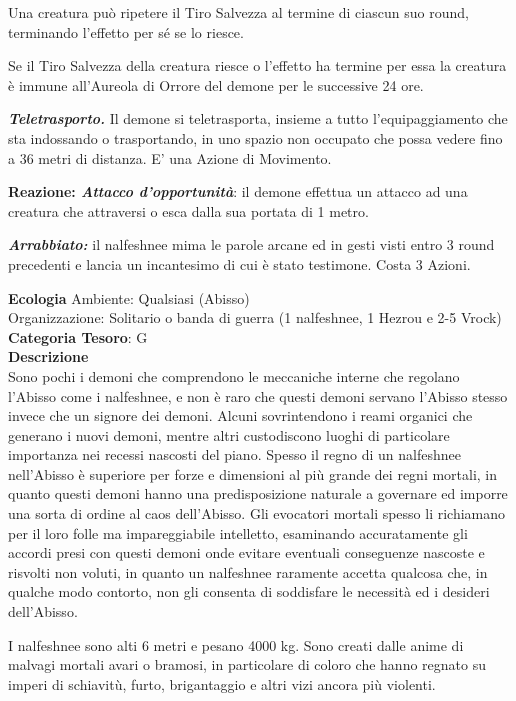 \begin{multicols}{2}
{Una creatura può ripetere il Tiro Salvezza al termine di ciascun suo round, terminando l'effetto per sé se lo riesce.

Se il Tiro Salvezza della creatura riesce o l'effetto ha termine per essa la creatura è immune all'Aureola di Orrore del demone per le successive 24 ore.

\emph{\textbf{Teletrasporto.}} Il demone si teletrasporta, insieme a tutto l'equipaggiamento che sta indossando o trasportando, in uno spazio non occupato che possa vedere fino a 36 metri di distanza. E' una Azione di Movimento.

\textbf{Reazione: \emph{Attacco d'opportunità}}: il demone effettua un attacco ad una creatura che attraversi o esca dalla sua portata di 1 metro.

\emph{\textbf{Arrabbiato:}} il nalfeshnee mima le parole arcane ed in gesti visti entro 3 round precedenti e lancia un incantesimo di cui è stato testimone. Costa 3 Azioni.

\textbf{Ecologia}
Ambiente: Qualsiasi (Abisso)\\
Organizzazione: Solitario o banda di guerra (1 nalfeshnee, 1 Hezrou e 2-5 Vrock)\\
\textbf{Categoria Tesoro}: G\\
\textbf{Descrizione}\\
Sono pochi i demoni che comprendono le meccaniche interne che regolano l'Abisso come i nalfeshnee, e non è raro che questi demoni servano l'Abisso stesso invece che un signore dei demoni. Alcuni sovrintendono i reami organici che generano i nuovi demoni, mentre altri custodiscono luoghi di particolare importanza nei recessi nascosti del piano. Spesso il regno di un nalfeshnee nell'Abisso è superiore per forze e dimensioni al più grande dei regni mortali, in quanto questi demoni hanno una predisposizione naturale a governare ed imporre una sorta di ordine al caos dell'Abisso. Gli evocatori mortali spesso li richiamano per il loro folle ma impareggiabile intelletto, esaminando accuratamente gli accordi presi con questi demoni onde evitare eventuali conseguenze nascoste e risvolti non voluti, in quanto un nalfeshnee raramente accetta qualcosa che, in qualche modo contorto, non gli consenta di soddisfare le necessità ed i desideri dell'Abisso.

I nalfeshnee sono alti 6 metri e pesano 4000 kg. Sono creati dalle anime di malvagi mortali avari o bramosi, in particolare di coloro che hanno regnato su imperi di schiavitù, furto, brigantaggio e altri vizi ancora più violenti.

}
\end{multicols}
